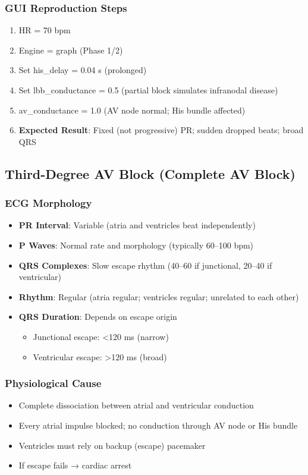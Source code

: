 \documentclass[11pt, a4paper]{article}
\begin{document}
\subsubsection{GUI Reproduction Steps}
\begin{enumerate}
    \item HR = 70 bpm
    \item Engine = graph (Phase 1/2)
    \item Set his\_delay = 0.04 s (prolonged)
    \item Set lbb\_conductance = 0.5 (partial block simulates infranodal disease)
    \item av\_conductance = 1.0 (AV node normal; His bundle affected)
    \item \textbf{Expected Result}: Fixed (not progressive) PR; sudden dropped beats; broad QRS
\end{enumerate}

\subsection{Third-Degree AV Block (Complete AV Block)}

\subsubsection{ECG Morphology}
\begin{itemize}
    \item \textbf{PR Interval}: Variable (atria and ventricles beat independently)
    \item \textbf{P Waves}: Normal rate and morphology (typically 60--100 bpm)
    \item \textbf{QRS Complexes}: Slow escape rhythm (40--60 if junctional, 20--40 if ventricular)
    \item \textbf{Rhythm}: Regular (atria regular; ventricles regular; unrelated to each other)
    \item \textbf{QRS Duration}: Depends on escape origin
        \begin{itemize}
            \item Junctional escape: <120 ms (narrow)
            \item Ventricular escape: >120 ms (broad)
        \end{itemize}
\end{itemize}

\subsubsection{Physiological Cause}
\begin{itemize}
    \item Complete dissociation between atrial and ventricular conduction
    \item Every atrial impulse blocked; no conduction through AV node or His bundle
    \item Ventricles must rely on backup (escape) pacemaker
    \item If escape fails → cardiac arrest
\end{itemize}
\end{document}
